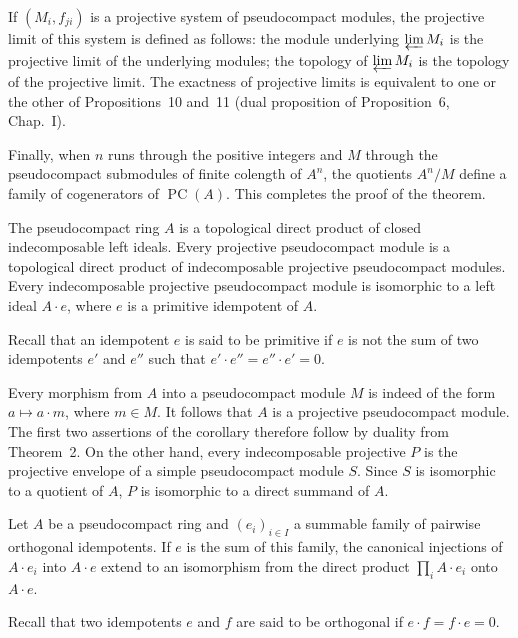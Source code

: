 If $(M_i,f_{ji})$ is a projective system of pseudocompact modules, the
projective limit of this system is defined as follows: the module
underlying $\varprojlim M_i$ is the projective limit of the underlying
modules; the topology of $\varprojlim M_i$ is the topology of the
projective limit. The exactness of projective limits is equivalent to
one or the other of Propositions~10 and~11 (dual proposition of
Proposition~6, Chap.~I).

Finally, when $n$ runs through the positive integers and $M$ through
the pseudocompact submodules of finite colength of $A^n$, the quotients
$A^n/M$ define a family of cogenerators of $\operatorname{PC}(A)$. This
completes the proof of the theorem.

\begin{corollary}
The pseudocompact ring $A$ is a topological direct product of closed
indecomposable left ideals. Every projective pseudocompact module is a
topological direct product of indecomposable projective pseudocompact
modules. Every indecomposable projective pseudocompact module is
isomorphic to a left ideal $A\cdot e$, where $e$ is a primitive
idempotent of $A$.
\end{corollary}

Recall that an idempotent $e$ is said to be primitive if $e$ is not the
sum of two idempotents $e'$ and $e''$ such that
$e'\cdot e''=e''\cdot e'=0$.

Every morphism from $A$ into a pseudocompact module $M$ is indeed of
the form $a\mapsto a\cdot m$, where $m\in M$. It follows that $A$ is a
projective pseudocompact module. The first two assertions of the
corollary therefore follow by duality from Theorem~2. On the other
hand, every indecomposable projective $P$ is the projective envelope of
a simple pseudocompact module $S$. Since $S$ is isomorphic to a
quotient of $A$, $P$ is isomorphic to a direct summand of $A$.

\begin{corollary}
Let $A$ be a pseudocompact ring and $(e_i)_{i\in I}$ a summable family
of pairwise orthogonal idempotents. If $e$ is the sum of this family,
the canonical injections of $A\cdot e_i$ into $A\cdot e$ extend to an
isomorphism from the direct product $\prod_i A\cdot e_i$ onto
$A\cdot e$.
\end{corollary}

Recall that two idempotents $e$ and $f$ are said to be orthogonal if
$e\cdot f=f\cdot e=0$.

